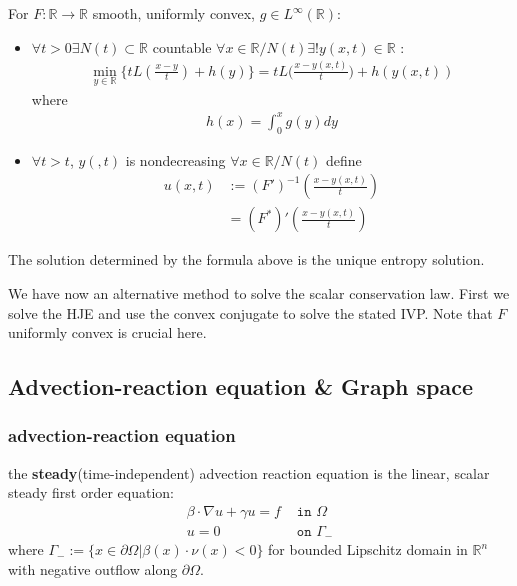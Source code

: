 \begin{theorem}
For $F: \mathbb{R} \rightarrow \mathbb{R}$ smooth, uniformly convex, $ g \in L^\infty(\mathbb{R})$: 
	\begin{itemize}
		\item $\forall t > 0 \exists N(t) \subset \mathbb{R}$ countable $\forall x \in \mathbb{R} \slash N(t) \exists !y(x, t) \in \mathbb{R}$ :
			\begin{align*}
				\min_{y \in \mathbb{R}} \bigg\{ t L(\frac{x - y}{t}) + h(y) \bigg\} = t L\bigg(\frac{x - y(x, t)}{t}\bigg) + h(y(x, t))
			\end{align*}
			where
			\begin{align*}
				h(x) = \int_0^x g(y) dy
			\end{align*}
		\item $\forall t > t$,  $y(, t)$ is nondecreasing $\forall x \in \mathbb{R} \slash N(t)$ define
			\begin{align*}
				u(x, t) &:= (F')^{-1}(\frac{x - y(x, t)}{t})\\
				&= (F^*)'(\frac{x - y(x, t)}{t})
			\end{align*}
	\end{itemize}
	The solution determined by the formula above is the unique entropy solution. 
\end{theorem}
\begin{remark}
We have now an alternative method to solve the scalar conservation law. First we solve the HJE and use the convex conjugate to solve the stated IVP. Note that $F$ uniformly convex is crucial here. 	
\end{remark}



\subsection{Advection-reaction equation \& Graph space}
\subsubsection{advection-reaction equation}

the \textbf{steady}(time-independent) advection reaction equation is the linear, scalar steady first order equation:
\begin{align*}
	\beta \cdot \nabla u + \gamma  u = f &\texttt{ in }\Omega \\
	u = 0  &\texttt{ on } \Gamma_-
\end{align*}
where $\Gamma_-:= \{x \in \partial \Omega | \beta(x) \cdot \nu(x) < 0\}$ for bounded Lipschitz domain in $\mathbb{R}^n$ with negative outflow along $\partial \Omega$. 


